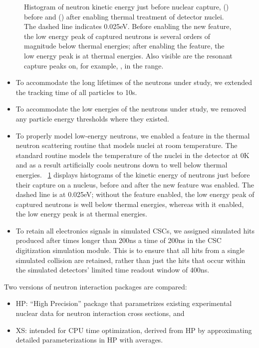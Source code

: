 \begin{figure}[htbp]
  \caption[Histogram of neutron kinetic energy just before nuclear capture, before and after enabling thermal treatment of detector nuclei.]{Histogram of neutron kinetic energy just before nuclear capture, () before and () after enabling thermal treatment of detector nuclei. The dashed line indicates 0.025\unit{eV}. Before enabling the new feature, the low energy peak of captured neutrons is several orders of magnitude below thermal energies; after enabling the feature, the low energy peak is at thermal energies. Also visible are the resonant capture peaks on, for example, , in the \keVns range.}
	\label{fig:nKE}
\end{figure}

\begin{itemize}
	\item To accommodate the long lifetimes of the neutrons under study, we extended the tracking time of all particles to 10\unit{s}.
	\item To accommodate the low energies of the neutrons under study, we removed any particle energy thresholds where they existed.
	\item To properly model low-energy neutrons, we enabled a feature in the \GEANTfour thermal neutron scattering routine that models nuclei at room temperature. The standard \GEANTfour routine models the temperature of the nuclei in the detector at 0\unit{K} and as a result artificially cools neutrons down to well below thermal energies. \Fig~\ref{fig:nKE} displays histograms of the kinetic energy of neutrons just before their capture on a nucleus, before and after the new feature was enabled. The dashed line is at 0.025\unit{eV}; without the feature enabled, the low energy peak of captured neutrons is well below thermal energies, whereas with it enabled, the low energy peak is at thermal energies.
	\item To retain all electronics signals in simulated CSCs, we assigned simulated hits produced after times longer than 200\unit{ns} a time of 200\unit{ns} in the CSC digitization simulation module. This is to ensure that all hits from a single simulated \pp collision are retained, rather than just the hits that occur within the simulated detectors' limited time readout window of 400\unit{ns}.
\end{itemize}

Two versions of \GEANTfour neutron interaction packages are compared:

\begin{itemize}
	\item HP: ``High Precision'' package that parametrizes existing experimental nuclear data for neutron interaction cross sections, and
	\item XS: intended for CPU time optimization, derived from HP by approximating detailed parameterizations in HP with averages.
\end{itemize}

